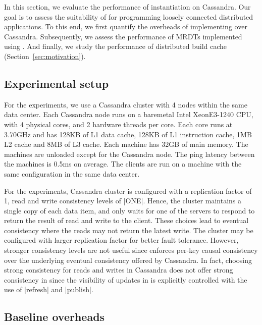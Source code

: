 In this section, we evaluate the performance of \name instantiation on
Cassandra. Our goal is to assess the suitability of \name for programming
loosely connected distributed applications. To this end, we first quantify the
overheads of implementing \name over Cassandra. Subsequently, we assess the
performance of MRDTs implemented using \name. And finally, we study the
performance of distributed build cache (Section~\ref{sec:motivation}).

\subsection{Experimental setup}

For the experiments, we use a Cassandra cluster with 4 nodes within the same
data center. Each Cassandra node runs on a baremetal Intel\textregistered
Xeon\textregistered E3-1240 CPU, with 4 physical cores, and 2 hardware threads
per core. Each core runs at 3.70GHz and has 128KB of L1 data cache, 128KB of L1
instruction cache, 1MB L2 cache and 8MB of L3 cache. Each machine has 32GB of
main memory. The machines are unloaded except for the Cassandra node. The ping
latency between the machines is 0.5ms on average. The clients are run on a
machine with the same configuration in the same data center.

For the experiments, Cassandra cluster is configured with a replication factor
of 1, read and write consistency levels of |ONE|. Hence, the cluster maintains
a single copy of each data item, and only waits for one of the servers to
respond to return the result of read and write to the client. These choices
lead to eventual consistency where the reads may not return the latest write.
The cluster may be configured with larger replication factor for better fault
tolerance. However, stronger consistency levels are not useful since \name
enforces per-key causal consistency over the underlying eventual consistency
offered by Cassandra. In fact, choosing strong consistency for reads and writes
in Cassandra does not offer strong consistency in \name since the visibility of
updates in \name is explicitly controlled with the use of |refresh| and
|publish|.

\subsection{Baseline overheads}

